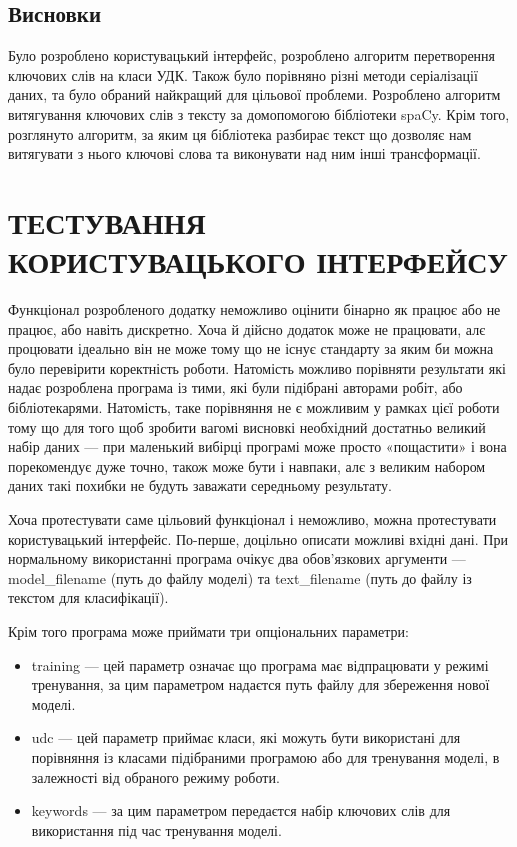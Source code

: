 \documentclass[14pt]{extarticle}
\let\oldsection\section
\renewcommand{\section}{\clearpage\oldsection}
\begin{document}
  \subsection{Висновки}
  Було розроблено користувацький інтерфейс,
  розроблено алгоритм перетворення ключових слів на класи УДК.
  Також було порівняно різні методи серіалізації даних,
  та було обраний найкращий для цільової проблеми.
  Розроблено алгоритм витягування ключових слів з тексту за
  домопомогою бібліотеки spaCy. Крім того, розглянуто алгоритм,
  за яким ця бібліотека разбирає текст що дозволяє нам витягувати
  з нього ключові слова та виконувати над ним інші трансформації.

  \section{ТЕСТУВАННЯ КОРИСТУВАЦЬКОГО ІНТЕРФЕЙСУ}
  Функціонал розробленого додатку неможливо оцінити бінарно як працює або
  не працює, або навіть дискретно. Хоча й дійсно додаток може не працювати,
  алє процювати ідеально він не може тому що не існує стандарту за яким
  би можна було перевірити коректність роботи. Натомість можливо порівняти
  результати які надає розроблена програма із тими, які були підібрані авторами
  робіт, або бібліотекарями. Натомість, таке порівняння не є можливим у
  рамках цієї роботи тому що для того щоб зробити вагомі висновкі необхідний
  достатньо великий набір даних --- при маленький вибірці програмі може просто
  «пощастити» і вона порекомендує дуже точно, також може бути і навпаки,
  алє з великим набором даних такі похибки не будуть заважати середньому
  результату.

  Хоча протестувати саме цільовий функціонал і неможливо,
  можна протестувати користувацький інтерфейс.
  По-перше, доцільно описати можливі вхідні дані.
  При нормальному використанні програма очікує два обов'язкових аргументи ---
  model\_filename (путь до файлу моделі) та
  text\_filename (путь до файлу із текстом для класифікації).

  Крім того програма може приймати три опціональних параметри:
  \begin{itemize}[labelindent=\dimexpr{}\relax, leftmargin=*]
    \item training --- цей параметр означає що програма має відпрацювати
      у режимі тренування,
      за цим параметром надаєтся путь файлу для збереження нової моделі.
    \item udc --- цей параметр приймає класи,
      які можуть бути використані для порівняння із класами
      підібраними програмою або для тренування моделі,
      в залежності від обраного режиму роботи.
    \item keywords --- за цим параметром передаєтся набір ключових слів
      для використання під час тренування моделі.
  \end{itemize}
\end{document}

